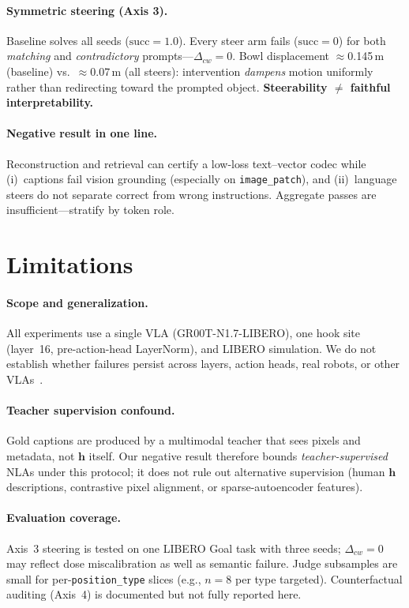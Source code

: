 \documentclass{article}
\newcommand{\hvec}{\mathbf{h}}
\newcommand{\code}[1]{\texttt{\small #1}}
\begin{document}
\paragraph{Symmetric steering (Axis 3).}
Baseline solves all seeds (\(\mathrm{succ}=1.0\)).
Every steer arm fails (\(\mathrm{succ}=0\)) for both \emph{matching} and
\emph{contradictory} prompts---\(\Delta_{cw}=0\).
Bowl displacement $\approx$0.145\,m (baseline) vs.\ $\approx$0.07\,m (all
steers): intervention \emph{dampens} motion uniformly rather than redirecting
toward the prompted object.
\textbf{Steerability \(\neq\) faithful interpretability.}

\paragraph{Negative result in one line.}
Reconstruction and retrieval can certify a low-loss text--vector codec
while (i)~captions fail vision grounding (especially on \code{image\_patch}),
and (ii)~language steers do not separate correct from wrong instructions.
Aggregate passes are insufficient---stratify by token role.

\section{Limitations}
\label{sec:limitations}

\paragraph{Scope and generalization.}
All experiments use a single VLA (GR00T-N1.7-LIBERO), one hook site (layer~16,
pre-action-head LayerNorm), and LIBERO simulation.
We do not establish whether failures persist across layers, action heads,
real robots, or other VLAs~\citep{brohan2023rt2,kim2024openvla}.

\paragraph{Teacher supervision confound.}
Gold captions are produced by a multimodal teacher that sees pixels and
metadata, not \(\hvec\) itself.
Our negative result therefore bounds \emph{teacher-supervised} NLAs under this
protocol; it does not rule out alternative supervision (human \(\hvec\)
descriptions, contrastive pixel alignment, or sparse-autoencoder features).

\paragraph{Evaluation coverage.}
Axis~3 steering is tested on one LIBERO Goal task with three seeds;
\(\Delta_{cw}=0\) may reflect dose miscalibration as well as semantic failure.
Judge subsamples are small for per-\code{position\_type} slices
(e.g., \(n{=}8\) per type targeted).
Counterfactual auditing (Axis~4) is documented but not fully reported here.
\end{document}
